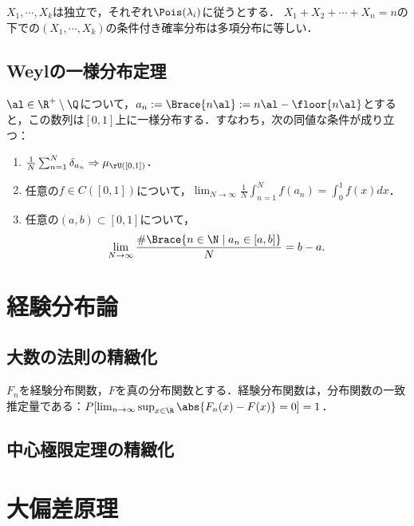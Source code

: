 \documentclass[uplatex,dvipdfmx]{jsreport}
\begin{document}
\begin{proposition}
    $X_1,\cdots,X_k$は独立で，それぞれ$\Pois(\lambda_i)$に従うとする．
    $X_1+X_2+\cdots+X_n=n$の下での$(X_1,\cdots,X_k)$の条件付き確率分布は多項分布に等しい．
\end{proposition}

\subsection{Weylの一様分布定理}

\begin{theorem}
    $\al\in\R^+\setminus\Q$について，$a_n:=\Brace{n\al}:=n\al-\floor{n\al}$とすると，この数列は$[0,1]$上に一様分布する．すなわち，次の同値な条件が成り立つ：
    \begin{enumerate}
        \item $\frac{1}{N}\sum_{n=1}^N\delta_{a_n}\Rightarrow\mu_{\rU([0,1])}$．
        \item 任意の$f\in C([0,1])$について，$\lim_{N\to\infty}\frac{1}{N}\int^N_{n=1}f(a_n)=\int^1_0f(x)dx$．
        \item 任意の$(a,b)\subset[0,1]$について，
        \[\lim_{N\to\infty}\frac{\#\Brace{n\in\N\mid a_n\in[a,b]}}{N}=b-a.\]
    \end{enumerate}
\end{theorem}

\section{経験分布論}

\subsection{大数の法則の精緻化}

\begin{theorem}
    $F_n$を経験分布関数，$F$を真の分布関数とする．経験分布関数は，分布関数の一致推定量である：$P[\lim_{n\to\infty}\sup_{x\in\R}\abs{F_n(x)-F(x)}=0]=1$．
\end{theorem}

\subsection{中心極限定理の精緻化}

\section{大偏差原理}
\end{document}
